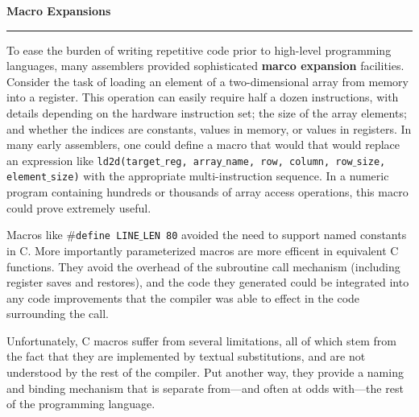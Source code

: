 \nopagenumbers
{\bf Macro Expansions}
\vskip 1mm
\hrule

\vskip 6pt
To ease the burden of writing repetitive code prior to high-level programming languages, many assemblers provided sophisticated {\bf marco expansion} facilities. Consider the task of loading an element of a two-dimensional array from memory into a register. This operation can easily require half a dozen instructions, with details depending on the hardware instruction set; the size of the array elements; and whether the indices are constants, values in memory, or values in registers. In many early assemblers, one could define a macro that would that would replace an expression like {\tt ld2d(target$\_$reg, array$\_$name, row, column, row$\_$size, element$\_$size)} with the appropriate multi-instruction sequence. In a numeric program containing hundreds or thousands of array access operations, this macro could prove extremely useful.

\vskip 6pt
Macros like {\tt $\#$define LINE$\_$LEN 80} avoided the need to support named constants in C. More importantly parameterized macros are more efficent in equivalent C functions. They avoid the overhead of the subroutine call mechanism (including register saves and restores), and the code they generated could be integrated into any code improvements that the compiler was able to effect in the code surrounding the call.

\vskip 6pt
Unfortunately, C macros suffer from several limitations, all of which stem from the fact that they are implemented by textual substitutions, and are not understood by the rest of the compiler. Put another way, they provide a naming and binding mechanism that is separate from---and often at odds with---the rest of the programming language.


\vfill\eject
\bye
